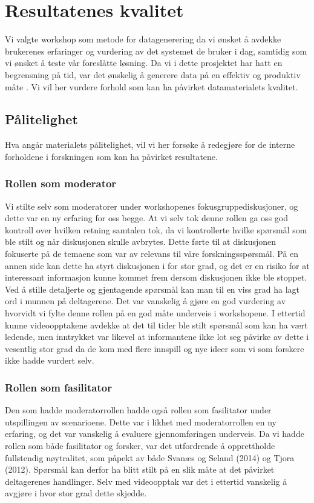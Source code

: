 \section{Resultatenes kvalitet}
\label{chp:analyse}

Vi valgte workshop som metode for datagenerering da vi ønsket å avdekke brukerenes erfaringer og vurdering av det systemet de bruker i dag, samtidig som vi ønsket å teste vår foreslåtte løsning. Da vi i dette prosjektet har hatt en begrensning på tid, var det ønskelig å generere data på en effektiv og produktiv måte \cite{Tjora}. Vi vil her vurdere forhold som kan ha påvirket datamaterialets kvalitet.

\subsection{Pålitelighet}
Hva angår materialets pålitelighet, vil vi her forsøke å redegjøre for de interne forholdene i forskningen som kan ha påvirket resultatene.

\subsubsection{Rollen som moderator}
Vi stilte selv som moderatorer under workshopenes fokusgruppediskusjoner, og dette var en ny erfaring for oss begge. At vi selv tok denne rollen ga oss god kontroll over hvilken retning samtalen tok, da vi kontrollerte hvilke spørsmål som ble stilt og når diskusjonen skulle avbrytes. Dette førte til at diskusjonen fokuserte på de temaene som var av relevans til våre forskningsspørsmål. På en annen side kan dette ha styrt diskusjonen i for stor grad, og det er en risiko for at interessant informasjon kunne kommet frem dersom diskusjonen ikke ble stoppet. Ved å stille detaljerte og gjentagende spørsmål kan man til en viss grad ha lagt ord i munnen på deltagerene. Det var vanskelig å gjøre en god vurdering av hvorvidt vi fylte denne rollen på en god måte underveis i workshopene. I ettertid kunne videoopptakene avdekke at det til tider ble stilt spørsmål som kan ha vært ledende, men inntrykket var likevel at informantene ikke lot seg påvirke av dette i vesentlig stor grad da de kom med flere innspill og nye ideer som vi som forskere ikke hadde vurdert selv.

\subsubsection{Rollen som fasilitator}
Den som hadde moderatorrollen hadde også rollen som fasilitator under utspillingen av scenarioene. Dette var i likhet med moderatorrollen en ny erfaring, og det var vanskelig å evaluere gjennomføringen underveis. Da vi hadde rollen som både fasilitator og forsker, var det utfordrende å opprettholde fullstendig nøytralitet, som påpekt av både Svanæs og Seland (2014) og Tjora (2012). Spørsmål kan derfor ha blitt stilt på en slik måte at det påvirket deltagerenes handlinger. Selv med videoopptak var det i ettertid vanskelig å avgjøre i hvor stor grad dette skjedde. 

